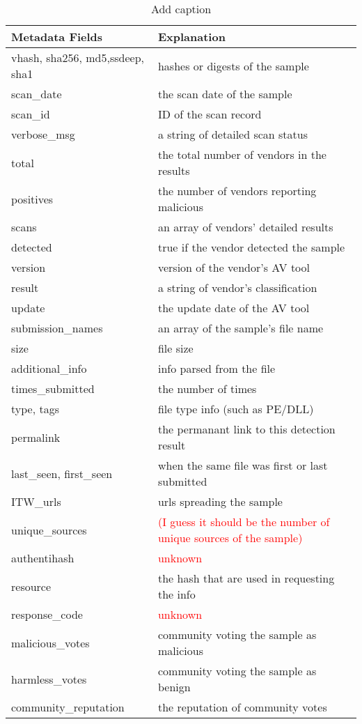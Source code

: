\begin{table}[htbp]
	\centering
	\caption{Add caption}\small
	\begin{tabularx}{\columnwidth}{p{8.9em}|X}
		\hline\hline
		Metadata Fields & Explanation \\\hline
		vhash, sha256, md5,\newline ssdeep, sha1 & hashes or digests of the sample  \\\hline
		scan\_date & the scan date of the sample \\
		scan\_id & ID of the scan record \\
		verbose\_msg & a string of detailed scan status \\
		total & the total number of vendors in the results\\
		positives & the number of vendors reporting malicious \\
		scans & an array of vendors' detailed results \\
		\qquad detected & true if the vendor detected the sample \\
		\qquad version & version of the vendor's AV tool \\
		\qquad result & a string of vendor's classification \\
		\qquad update & the update date of the AV tool \\\hline
		submission\_names & an array of the sample's file name \\
		size  & file size \\
		additional\_info & info parsed from the file \\
		times\_submitted & the number of times \\
		type, tags & file type info (such as PE/DLL) \\
		permalink & the permanant link to this detection result \\
		last\_seen, first\_seen & when the same file was first or last submitted \\
		ITW\_urls & urls spreading the sample \\
		unique\_sources & \textcolor{red}{(I guess it should be the number of unique sources of the sample)} \\\hline
		authentihash & \textcolor{red}{unknown} \\
		resource & the hash that are used in requesting the info \\
		response\_code & \textcolor{red}{unknown} \\
		malicious\_votes & community voting the sample as malicious  \\
		harmless\_votes & community voting the sample as benign \\
		community\_reputation & the reputation of community votes \\\hline
	\end{tabularx}%
	\label{tab:metadata}%
\end{table}%
